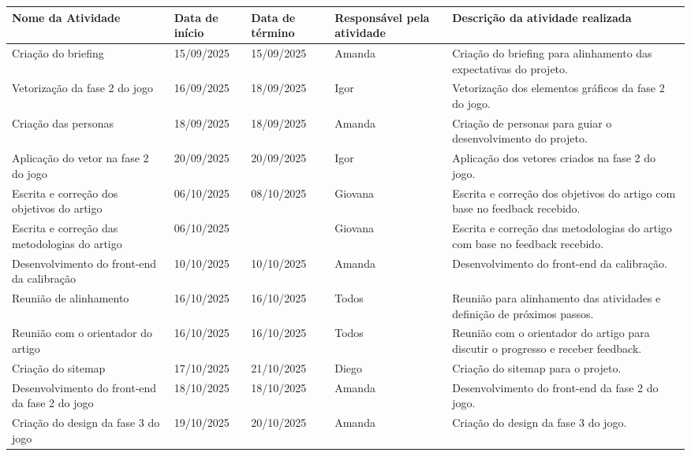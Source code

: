 \documentclass[
landscape,
  a4paper,%
  12pt,%
  english,%
  brazilian,%
]{article}
\begin{document}
\break

 \begin{table}[]
\centering
\begin{tabular}{|p{5cm}|l|l|l|p{8cm}|}
\hline
Nome da Atividade & Data de início & Data de término & Responsável pela atividade & Descrição da atividade realizada \\ \hline
Criação do briefing                               & 15/09/2025 & 15/09/2025 & Amanda  & Criação do briefing para alinhamento das expectativas do projeto. \\ \hline
Vetorização da fase 2 do jogo                     & 16/09/2025 & 18/09/2025 & Igor  & Vetorização dos elementos gráficos da fase 2 do jogo. \\ \hline
Criação das personas                              & 18/09/2025 & 18/09/2025 & Amanda  & Criação de personas para guiar o desenvolvimento do projeto. \\ \hline
Aplicação do vetor na fase 2 do jogo                  & 20/09/2025 & 20/09/2025 & Igor  & Aplicação dos vetores criados na fase 2 do jogo. \\ \hline
Escrita e correção dos objetivos do artigo        & 06/10/2025 & 08/10/2025 & Giovana & Escrita e correção dos objetivos do artigo com base no feedback recebido. \\ \hline
Escrita e correção das metodologias do artigo     & 06/10/2025 &            & Giovana & Escrita e correção das metodologias do artigo com base no feedback recebido. \\ \hline
Desenvolvimento do front-end da calibração        & 10/10/2025 & 10/10/2025 & Amanda  & Desenvolvimento do front-end da calibração. \\ \hline
Reunião de alinhamento                            & 16/10/2025  & 16/10/2025 & Todos   & Reunião para alinhamento das atividades e definição de próximos passos. \\ \hline
Reunião com o orientador do artigo                & 16/10/2025  & 16/10/2025 & Todos   & Reunião com o orientador do artigo para discutir o progresso e receber feedback. \\ \hline
Criação do sitemap & 17/10/2025 & 21/10/2025 & Diego   & Criação do sitemap para o projeto. \\ \hline
Desenvolvimento do front-end da fase 2 do jogo    & 18/10/2025  & 18/10/2025 & Amanda   & Desenvolvimento do front-end da fase 2 do jogo. \\ \hline
Criação do design da fase 3 do jogo               & 19/10/2025  & 20/10/2025 & Amanda   & Criação do design da fase 3 do jogo. \\ \hline

\end{tabular}
\end{table}
\end{document}
